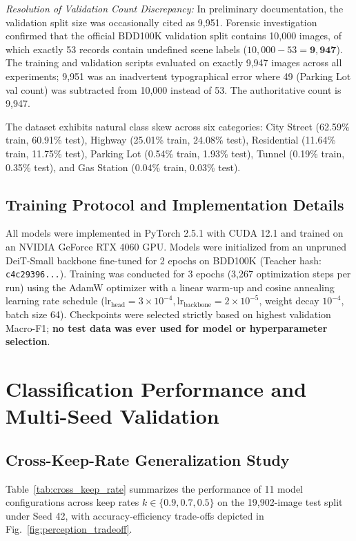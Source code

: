 \documentclass[conference]{IEEEtran}
\begin{document}
\textit{Resolution of Validation Count Discrepancy:} In preliminary documentation, the validation split size was occasionally cited as 9,951. Forensic investigation confirmed that the official BDD100K validation split contains 10,000 images, of which exactly 53 records contain undefined scene labels ($10,000 - 53 = \mathbf{9,947}$). The training and validation scripts evaluated on exactly 9,947 images across all experiments; 9,951 was an inadvertent typographical error where 49 (Parking Lot val count) was subtracted from 10,000 instead of 53. The authoritative count is 9,947.

The dataset exhibits natural class skew across six categories: City Street (62.59\% train, 60.91\% test), Highway (25.01\% train, 24.08\% test), Residential (11.64\% train, 11.75\% test), Parking Lot (0.54\% train, 1.93\% test), Tunnel (0.19\% train, 0.35\% test), and Gas Station (0.04\% train, 0.03\% test).

\subsection{Training Protocol and Implementation Details}
All models were implemented in PyTorch 2.5.1 with CUDA 12.1 and trained on an NVIDIA GeForce RTX 4060 GPU. Models were initialized from an unpruned DeiT-Small backbone fine-tuned for 2 epochs on BDD100K (Teacher hash: \texttt{c4c29396...}). Training was conducted for 3 epochs (3,267 optimization steps per run) using the AdamW optimizer with a linear warm-up and cosine annealing learning rate schedule ($\text{lr}_{\text{head}} = 3 \times 10^{-4}, \text{lr}_{\text{backbone}} = 2 \times 10^{-5}$, weight decay $10^{-4}$, batch size 64). Checkpoints were selected strictly based on highest validation Macro-F1; \textbf{no test data was ever used for model or hyperparameter selection}.

\section{Classification Performance and Multi-Seed Validation}

\subsection{Cross-Keep-Rate Generalization Study}
Table~\ref{tab:cross_keep_rate} summarizes the performance of 11 model configurations across keep rates $k \in \{0.9, 0.7, 0.5\}$ on the 19,902-image test split under Seed 42, with accuracy-efficiency trade-offs depicted in Fig.~\ref{fig:perception_tradeoff}.
\end{document}
